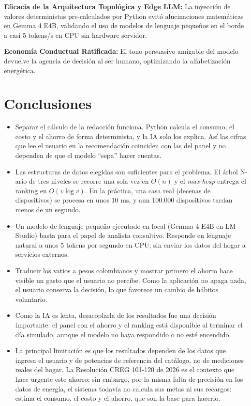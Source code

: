 \documentclass[10pt,journal,compsoc]{IEEEtran}
\begin{document}
\textbf{Eficacia de la Arquitectura Topológica y Edge LLM:} La inyección de valores deterministas pre-calculados por Python evitó alucinaciones matemáticas en Gemma 4 E4B, validando el uso de modelos de lenguaje pequeños en el borde a casi 5 tokens/s en CPU sin hardware servidor.

\textbf{Economía Conductual Ratificada:} El tono persuasivo amigable del modelo devuelve la agencia de decisión al ser humano, optimizando la alfabetización energética.

\section{Conclusiones}
\begin{itemize}
\item Separar el cálculo de la redacción funciona. Python calcula el consumo, el costo y el ahorro de forma determinista, y la IA solo los explica. Así las cifras que lee el usuario en la recomendación coinciden con las del panel y no dependen de que el modelo ``sepa'' hacer cuentas.
\item Las estructuras de datos elegidas son suficientes para el problema. El árbol N-ario de tres niveles se recorre una sola vez en $O(n)$ y el \emph{max-heap} entrega el ranking en $O(v\log v)$. En la práctica, una casa real (decenas de dispositivos) se procesa en unos 10 ms, y aun 100.000 dispositivos tardan menos de un segundo.
\item Un modelo de lenguaje pequeño ejecutado en local (Gemma 4 E4B en LM Studio) basta para el papel de analista consultivo. Responde en lenguaje natural a unos 5 tokens por segundo en CPU, sin enviar los datos del hogar a servicios externos.
\item Traducir los vatios a pesos colombianos y mostrar primero el ahorro hace visible un gasto que el usuario no percibe. Como la aplicación no apaga nada, el usuario conserva la decisión, lo que favorece un cambio de hábitos voluntario.
\item Como la IA es lenta, desacoplarla de los resultados fue una decisión importante: el panel con el ahorro y el ranking está disponible al terminar el día simulado, aunque el modelo no haya respondido o no esté encendido.
\item La principal limitación es que los resultados dependen de los datos que ingresa el usuario y de potencias de referencia del catálogo, no de mediciones reales del hogar. La Resolución CREG 101-120 de 2026 es el contexto que hace urgente este ahorro; sin embargo, por la misma falta de precisión en los datos de energía, el sistema todavía no calcula sus metas ni sus recargos: estima el consumo, el costo y el ahorro, que son la base para hacerlo.
\end{itemize}
\end{document}
